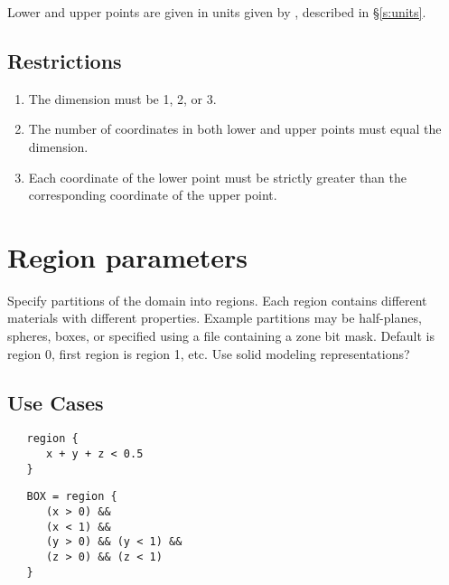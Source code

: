 \documentclass{book}
\begin{document}
Lower and upper points are given in units given by ,
described in \S\ref{s:units}.

\subsection{Restrictions}

\begin{enumerate}
\item The dimension must be 1, 2, or 3.
\item The number of coordinates in both lower and upper points must equal the dimension.
\item Each coordinate of the lower point must be strictly greater than the corresponding coordinate of the upper point.
\end{enumerate}


\section{Region parameters} \label{s:region}

Specify partitions of the domain into regions.  Each region contains
different materials with different properties.  Example partitions may
be half-planes, spheres, boxes, or specified using a file containing a
zone bit mask.  Default is region 0, first region is region 1, etc.
Use solid modeling representations?

\subsection{Use Cases}

\begin{verbatim}
   region {
      x + y + z < 0.5
   }
\end{verbatim}

\begin{verbatim}
   BOX = region {
      (x > 0) &&
      (x < 1) &&
      (y > 0) && (y < 1) &&
      (z > 0) && (z < 1)
   }
\end{verbatim}
\end{document}
